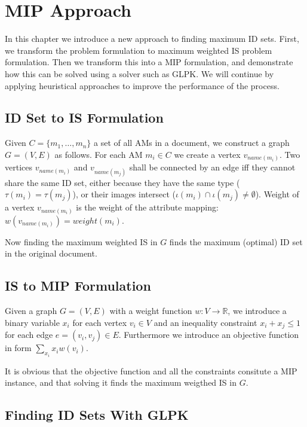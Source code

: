 \chapter{MIP Approach}
\label{chapter-mip}

In this chapter we introduce a new approach to finding maximum ID sets. First, we transform the problem formulation to maximum weighted IS problem formulation. Then we transform this into a MIP formulation, and demonstrate how this can be solved using a solver such as GLPK. 
We will continue by applying heuristical approaches to improve the performance of the process.

\section{ID Set to IS Formulation}

Given $C = \{m_1, \ldots, m_n\}$ a set of all AMs in a document, we construct a graph $G = (V,E)$ as follows. For each AM $m_i \in C$ we create a vertex $v_{name(m_i)}$. Two vertices $v_{name(m_i)}$ and $v_{name(m_j)}$ shall be connected by an edge iff they cannot share the same ID set, either because they have the same type ($\tau(m_i) = \tau(m_j)$), or their images intersect ($\iota(m_i) \cap \iota(m_j) \neq \emptyset$). Weight of a vertex $v_{name(m_i)}$ is the weight of the attribute mapping: $w(v_{name(m_i)}) = weight(m_i)$.

Now finding the maximum weighted IS in $G$ finds the maximum (optimal) ID set in the original document.

\section{IS to MIP Formulation}

Given a graph $G = (V,E)$ with a weight function $w: V \rightarrow \mathbb{R}$, we introduce a binary variable $x_i$ for each vertex $v_i \in V$ and an inequality constraint $x_i + x_j \leq 1$ for each edge $e = (v_i, v_j) \in E$. Furthermore we introduce an objective function in form $\sum_{x_i} x_i w(v_i)$.

It is obvious that the objective function and all the constraints consitute a MIP instance, and that solving it finds the maximum weigthed IS in $G$.

\section{Finding ID Sets With GLPK}
\label{section-mip-glpk}

